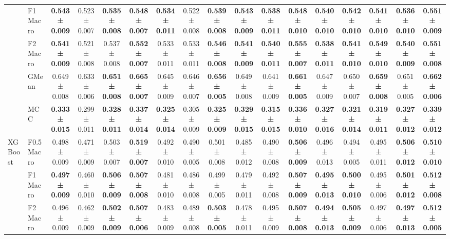 \begin{table}[H]
{\begin{tabular}{llccccccccccccccc}
 & F1 Macro & \textbf{0.543 ± 0.009} & 0.523 ± 0.007 & \textbf{0.535 ± 0.008} & \textbf{0.548 ± 0.007} & \textbf{0.534 ± 0.011} & 0.522 ± 0.008 & \textbf{0.539 ± 0.008} & \textbf{0.543 ± 0.009} & \textbf{0.538 ± 0.011} & \textbf{0.548 ± 0.010} & \textbf{0.540 ± 0.010} & \textbf{0.542 ± 0.010} & \textbf{0.541 ± 0.010} & \textbf{0.536 ± 0.010} & \textbf{0.551 ± 0.009} \\
 & F2 Macro & \textbf{0.541 ± 0.009} & 0.521 ± 0.008 & 0.537 ± 0.008 & \textbf{0.552 ± 0.007} & 0.533 ± 0.011 & 0.533 ± 0.011 & \textbf{0.546 ± 0.008} & \textbf{0.541 ± 0.009} & \textbf{0.540 ± 0.011} & \textbf{0.555 ± 0.007} & \textbf{0.538 ± 0.011} & \textbf{0.541 ± 0.010} & \textbf{0.549 ± 0.010} & \textbf{0.540 ± 0.009} & \textbf{0.551 ± 0.008} \\
 & GMean & 0.649 ± 0.008 & 0.633 ± 0.006 & \textbf{0.651 ± 0.008} & \textbf{0.665 ± 0.007} & 0.645 ± 0.009 & 0.646 ± 0.007 & \textbf{0.656 ± 0.005} & 0.649 ± 0.008 & 0.641 ± 0.009 & \textbf{0.661 ± 0.005} & 0.647 ± 0.009 & 0.650 ± 0.007 & \textbf{0.659 ± 0.008} & 0.651 ± 0.005 & \textbf{0.662 ± 0.006} \\
 & MCC & \textbf{0.333 ± 0.015} & 0.299 ± 0.011 & \textbf{0.328 ± 0.011} & \textbf{0.337 ± 0.014} & \textbf{0.325 ± 0.014} & 0.305 ± 0.009 & \textbf{0.325 ± 0.009} & \textbf{0.329 ± 0.015} & \textbf{0.315 ± 0.015} & \textbf{0.336 ± 0.010} & \textbf{0.327 ± 0.016} & \textbf{0.321 ± 0.014} & \textbf{0.319 ± 0.011} & \textbf{0.327 ± 0.012} & \textbf{0.339 ± 0.012} \\
\cline{1-17}
\multirow[t]{5}{*}{XGBoost} & F0.5 Macro & 0.498 ± 0.009 & 0.471 ± 0.009 & 0.503 ± 0.007 & \textbf{0.519 ± 0.007} & 0.492 ± 0.010 & 0.490 ± 0.005 & 0.501 ± 0.008 & 0.485 ± 0.012 & 0.490 ± 0.008 & \textbf{0.506 ± 0.009} & 0.496 ± 0.013 & 0.494 ± 0.005 & 0.495 ± 0.011 & \textbf{0.506 ± 0.012} & \textbf{0.510 ± 0.010} \\
 & F1 Macro & \textbf{0.497 ± 0.009} & 0.460 ± 0.010 & \textbf{0.506 ± 0.009} & \textbf{0.507 ± 0.008} & 0.481 ± 0.010 & 0.486 ± 0.008 & 0.499 ± 0.005 & 0.479 ± 0.011 & 0.492 ± 0.008 & \textbf{0.507 ± 0.009} & \textbf{0.495 ± 0.013} & \textbf{0.500 ± 0.010} & 0.495 ± 0.006 & \textbf{0.501 ± 0.012} & \textbf{0.512 ± 0.008} \\
 & F2 Macro & 0.496 ± 0.009 & 0.462 ± 0.009 & \textbf{0.502 ± 0.009} & \textbf{0.507 ± 0.006} & 0.483 ± 0.009 & 0.489 ± 0.008 & \textbf{0.503 ± 0.005} & 0.478 ± 0.011 & 0.495 ± 0.009 & \textbf{0.507 ± 0.008} & \textbf{0.494 ± 0.013} & \textbf{0.505 ± 0.009} & 0.497 ± 0.006 & \textbf{0.497 ± 0.013} & \textbf{0.512 ± 0.005} \\

\end{tabular}}
\end{table}
